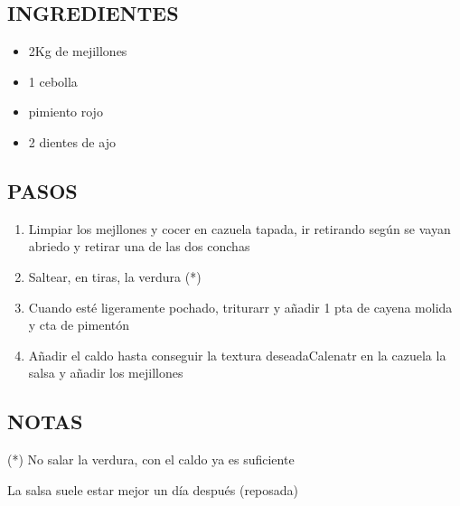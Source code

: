
\subsection*{INGREDIENTES}
\begin{itemize}
    \item 2Kg de mejillones
    \item 1 cebolla
    \item {} pimiento rojo
    \item 2 dientes de ajo
\end{itemize}

\subsection*{PASOS}
\begin{enumerate}
    \item Limpiar los mejllones y cocer en cazuela tapada, ir retirando según se vayan abriedo y retirar una de las dos conchas
    \item Saltear, en tiras, la verdura (*)
    \item Cuando esté ligeramente pochado, triturarr y añadir 1 pta de cayena molida y  cta de pimentón
    \item Añadir el caldo hasta conseguir la textura deseadaCalenatr en la cazuela la salsa y añadir los mejillones
\end{enumerate}

\subsection*{NOTAS}
(*) No salar la verdura, con el caldo ya es suficiente

La salsa suele estar mejor un día después (reposada)

